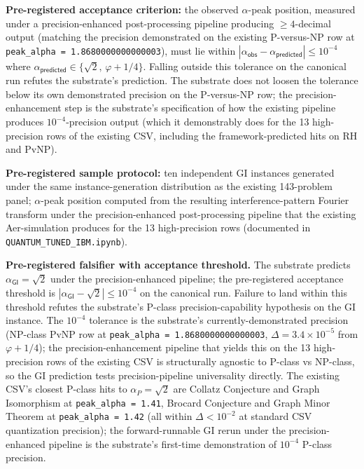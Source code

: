 \documentclass[11pt,a4paper]{amsart}
\theoremstyle{plain}
\theoremstyle{definition}
\begin{document}
\textbf{Pre-registered acceptance criterion:} the observed $\alpha$-peak position, measured under a precision-enhanced post-processing pipeline producing $\ge 4$-decimal output (matching the precision demonstrated on the existing P-versus-NP row at \texttt{peak\_alpha = 1.8680000000000003}), must lie within $|\alpha_{\textsf{obs}} - \alpha_{\textsf{predicted}}| \le 10^{-4}$ where $\alpha_{\textsf{predicted}} \in \{\sqrt{2},\,\varphi + 1/4\}$. Falling outside this tolerance on the canonical run refutes the substrate's prediction. The substrate does not loosen the tolerance below its own demonstrated precision on the P-versus-NP row; the precision-enhancement step is the substrate's specification of how the existing pipeline produces $10^{-4}$-precision output (which it demonstrably does for the 13 high-precision rows of the existing CSV, including the framework-predicted hits on RH and PvNP).

\textbf{Pre-registered sample protocol:} ten independent GI instances generated under the same instance-generation distribution as the existing 143-problem panel; $\alpha$-peak position computed from the resulting interference-pattern Fourier transform under the precision-enhanced post-processing pipeline that the existing Aer-simulation produces for the 13 high-precision rows (documented in \texttt{QUANTUM\_TUNED\_IBM.ipynb}).

\textbf{Pre-registered falsifier with acceptance threshold.} The substrate predicts $\alpha_{\textsf{GI}} = \sqrt{2}$ under the precision-enhanced pipeline; the pre-registered acceptance threshold is $|\alpha_{\textsf{GI}} - \sqrt{2}| \le 10^{-4}$ on the canonical run. Failure to land within this threshold refutes the substrate's P-class precision-capability hypothesis on the GI instance. The $10^{-4}$ tolerance is the substrate's currently-demonstrated precision (NP-class PvNP row at \texttt{peak\_alpha = 1.8680000000000003}, $\Delta = 3.4 \times 10^{-5}$ from $\varphi + 1/4$); the precision-enhancement pipeline that yields this on the 13 high-precision rows of the existing CSV is structurally agnostic to P-class vs NP-class, so the GI prediction tests precision-pipeline universality directly. The existing CSV's closest P-class hits to $\alpha_{P} = \sqrt{2}$ are Collatz Conjecture and Graph Isomorphism at \texttt{peak\_alpha = 1.41}, Brocard Conjecture and Graph Minor Theorem at \texttt{peak\_alpha = 1.42} (all within $\Delta < 10^{-2}$ at standard CSV quantization precision); the forward-runnable GI rerun under the precision-enhanced pipeline is the substrate's first-time demonstration of $10^{-4}$ P-class precision.
\end{document}
